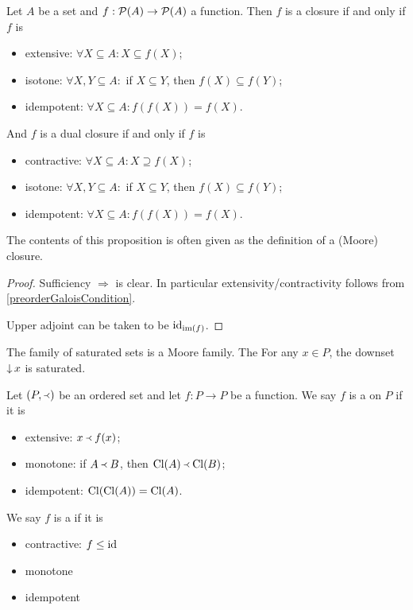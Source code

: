 \begin{proposition}
Let $A$ be a set and $f: \operatorname{\mathcal{P}}(A) \to \operatorname{\mathcal{P}}(A)$ a function. Then $f$ is a closure \textup{if and only if} $f$ is
\begin{itemize}
\item extensive: $\forall X\subseteq A: X \subseteq f(X)$;
\item isotone: $\forall X,Y\subseteq A: $ if $X \subseteq Y$, then $f(X) \subseteq f(Y)$;
\item idempotent: $\forall X\subseteq A:  f(f(X)) = f(X)$.
\end{itemize}
And $f$ is a dual closure \textup{if and only if} $f$ is
\begin{itemize}
\item contractive: $\forall X\subseteq A: X \supseteq f(X)$;
\item isotone: $\forall X,Y\subseteq A: $ if $X \subseteq Y$, then $f(X) \subseteq f(Y)$;
\item idempotent: $\forall X\subseteq A:  f(f(X)) = f(X)$.
\end{itemize}
\end{proposition}
The contents of this proposition is often given as the definition of a (Moore) closure.
\begin{proof}
Sufficiency $\Rightarrow$ is clear. In particular extensivity/contractivity follows from \ref{preorderGaloisCondition}.

Upper adjoint can be taken to be $\operatorname{id}_{\operatorname{im}(f)}$.
\end{proof}



The family of saturated sets is a Moore family. The For any $x\in P$, the downset $\operatorname{\downarrow} x$ is saturated.

\begin{definition}
Let $\sSet{P,\Yleft}$ be an ordered set and let $f:P \to P$ be a function. We say $f$ is a  on $P$ if it is
\begin{itemize}
\item extensive: $x \Yleft f(x)$;
\item monotone: if $A \Yleft B$, then $\operatorname{Cl}(A) \Yleft \operatorname{Cl}(B)$;
\item idempotent: $\operatorname{Cl}(\operatorname{Cl}(A)) = \operatorname{Cl}(A)$.
\end{itemize}
We say $f$ is a  if it is
\begin{itemize}
\item contractive: $f \leq \operatorname{id}$
\item monotone
\item idempotent
\end{itemize}
\end{definition}

